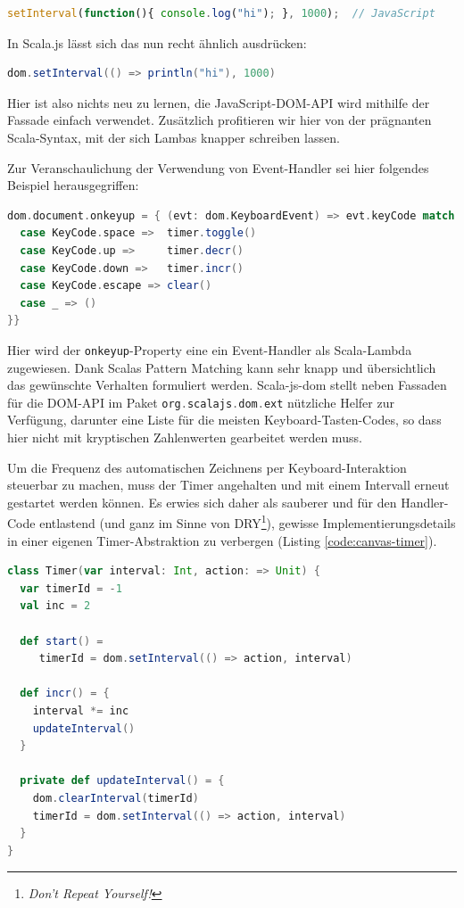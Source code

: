 \documentclass[a4paper, 12pt, hidelinks, listof=totoc, listoftables=totoc, bibliography=totoc]{scrreprt}
\newcommand{\scala}[1]{\lstinline[language=Scala, style=inline]|#1|}
\begin{document}
\begin{lstlisting}[language=JavaScript, style=snippet]
setInterval(function(){ console.log("hi"); }, 1000);  // JavaScript
\end{lstlisting}

In Scala.js lässt sich das nun recht ähnlich ausdrücken:

\begin{lstlisting}[language=Scala, style=snippet]
dom.setInterval(() => println("hi"), 1000)
\end{lstlisting}

Hier ist also nichts neu zu lernen, die JavaScript-DOM-API wird mithilfe der Fassade einfach verwendet. Zusätzlich profitieren wir hier von der prägnanten Scala-Syntax, mit der sich Lambas knapper schreiben lassen.

Zur Veranschaulichung der Verwendung von Event-Handler sei hier folgendes Beispiel herausgegriffen:

\begin{lstlisting}[language=Scala, style=snippet]
dom.document.onkeyup = { (evt: dom.KeyboardEvent) => evt.keyCode match {
  case KeyCode.space =>  timer.toggle()
  case KeyCode.up =>     timer.decr()
  case KeyCode.down =>   timer.incr()
  case KeyCode.escape => clear()
  case _ => ()
}}
\end{lstlisting}

Hier wird der \scala{onkeyup}-Property eine ein Event-Handler als Scala-Lambda zugewiesen. Dank Scalas Pattern Matching kann sehr knapp und übersichtlich das gewünschte Verhalten formuliert werden. Scala-js-dom stellt neben Fassaden für die DOM-API im Paket \scala{org.scalajs.dom.ext} nützliche Helfer zur Verfügung, darunter eine Liste für die meisten Keyboard-Tasten-Codes, so dass hier nicht mit kryptischen Zahlenwerten gearbeitet werden muss.

Um die Frequenz des automatischen Zeichnens per Keyboard-Interaktion steuerbar zu machen, muss der Timer angehalten und mit einem Intervall erneut gestartet werden können. Es erwies sich daher als sauberer und für den Handler-Code entlastend (und ganz im Sinne von DRY\footnote{\textit{Don't Repeat Yourself!}}), gewisse Implementierungsdetails in einer eigenen Timer-Abstraktion zu verbergen (Listing \ref{code:canvas-timer}).
		
\begin{lstlisting}[language=Scala, caption={Timer-Klasse des Canvas-Beispiels.}, label={code:canvas-timer}]
class Timer(var interval: Int, action: => Unit) {
  var timerId = -1
  val inc = 2

  def start() =
     timerId = dom.setInterval(() => action, interval)
   
  def incr() = {
    interval *= inc
    updateInterval()
  }

  private def updateInterval() = {
    dom.clearInterval(timerId)
    timerId = dom.setInterval(() => action, interval)
  }
}
\end{lstlisting}
\end{document}
